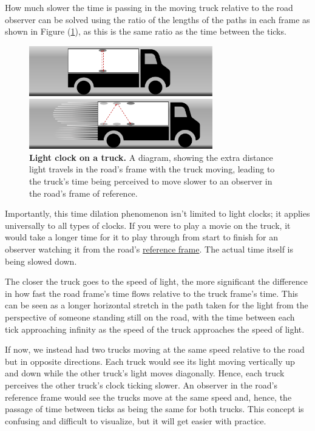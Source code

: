 How much slower the time is passing in the moving truck relative to the road observer can be solved using the ratio of the lengths of the paths in each frame as shown in Figure (\ref{fig: truck clock}), as this is the same ratio as the time between the ticks.

\begin{figure}[H]
	\centering
	\includegraphics[width = 8cm]{images/pdf/lorry_clock.pdf}
	\caption{\textbf{Light clock on a truck.} A diagram, showing the extra distance light travels in the road's frame with the truck moving, leading to the truck's time being perceived to move slower to an observer in the road's frame of reference.}
	\label{fig: truck clock}
\end{figure}

Importantly, this time dilation phenomenon isn't limited to light clocks; it applies universally to all types of clocks.
If you were to play a movie on the truck, it would take a longer time for it to play through from start to finish for an observer watching it from the road's \hyperlink{def-Reference-frame}{reference frame}.
The actual time itself is being slowed down.

The closer the truck goes to the speed of light, the more significant the difference in how fast the road frame's time flows relative to the truck frame's time.
This can be seen as a longer horizontal stretch in the path taken for the light from the perspective of someone standing still on the road, with the time between each tick approaching infinity as the speed of the truck approaches the speed of light.

If now, we instead had two trucks moving at the same speed relative to the road but in opposite directions.
Each truck would see its light moving vertically up and down while the other truck's light moves diagonally.
Hence, each truck perceives the other truck's clock ticking slower.
An observer in the road's reference frame would see the trucks move at the same speed and, hence, the passage of time between ticks as being the same for both trucks.
This concept is confusing and difficult to visualize, but it will get easier with practice.

